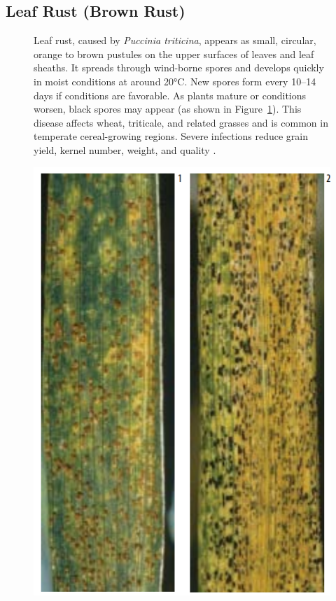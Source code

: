 \subsection{Leaf Rust (Brown Rust)} 

\begin{figure}[H]
    \centering
    \begin{minipage}{0.65\textwidth}
        \small
        Leaf rust, caused by \textit{Puccinia triticina}, appears as small, circular, orange to brown pustules on the upper surfaces of leaves and leaf sheaths. It spreads through wind-borne spores and develops quickly in moist conditions at around 20°C. New spores form every 10–14 days if conditions are favorable. As plants mature or conditions worsen, black spores may appear (as shown in Figure~\ref{fig:Figure03}). This disease affects wheat, triticale, and related grasses and is common in temperate cereal-growing regions. Severe infections reduce grain yield, kernel number, weight, and quality \parencite{duveiller2012wheat}.
    \end{minipage}%
    \hfill
    \begin{minipage}{0.3\textwidth}
        \centering
        \includegraphics[width=0.6\linewidth]{chapters/chapter2/images/Figure03.png} %
        \label{fig:Figure03}
    \end{minipage}
\end{figure}



